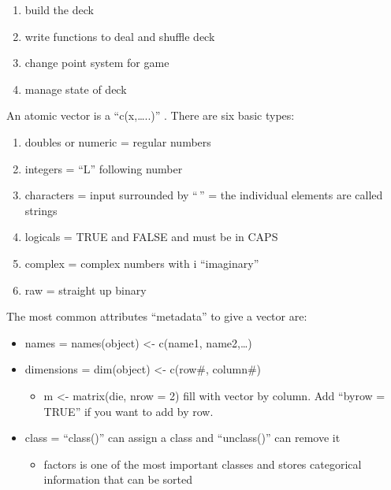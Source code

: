 \documentclass[
]{article}
\providecommand{\tightlist}{%
  \setlength{\itemsep}{0pt}\setlength{\parskip}{0pt}}
\begin{document}
\begin{enumerate}
\def\labelenumi{\arabic{enumi}.}
\tightlist
\item
  build the deck
\item
  write functions to deal and shuffle deck
\item
  change point system for game
\item
  manage state of deck
\end{enumerate}

An atomic vector is a ``c(x,\ldots..)'' . There are six basic types:

\begin{enumerate}
\def\labelenumi{\arabic{enumi}.}
\tightlist
\item
  doubles or numeric = regular numbers
\item
  integers = ``L'' following number
\item
  characters = input surrounded by ``\,'' = the individual elements are
  called strings
\item
  logicals = TRUE and FALSE and must be in CAPS
\item
  complex = complex numbers with i ``imaginary''
\item
  raw = straight up binary
\end{enumerate}

The most common attributes ``metadata'' to give a vector are:

\begin{itemize}
\tightlist
\item
  names = names(object) \textless- c(name1, name2,\ldots)
\item
  dimensions = dim(object) \textless- c(row\#, column\#)

  \begin{itemize}
  \tightlist
  \item
    m \textless- matrix(die, nrow = 2) fill with vector by column. Add
    ``byrow = TRUE'' if you want to add by row.
  \end{itemize}
\item
  class = ``class()'' can assign a class and ``unclass()'' can remove it

  \begin{itemize}
  \tightlist
  \item
    factors is one of the most important classes and stores categorical
    information that can be sorted
  \end{itemize}
\end{itemize}
\end{document}
